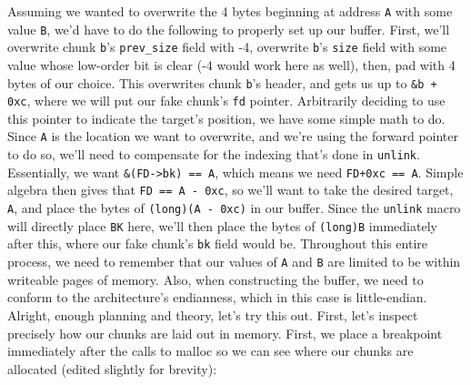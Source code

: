 Assuming we wanted to overwrite the 4 bytes beginning at address \texttt{A} with
some value \texttt{B}, we'd have to do the following to properly set up our
buffer. First, we'll overwrite chunk \texttt{b}'s \texttt{prev\_size} field with
-4, overwrite \texttt{b}'s \texttt{size} field with some value whose low-order bit
is clear (-4 would work here as well), then, pad with 4 bytes of our choice. This
overwrites chunk \texttt{b}'s header, and gets us up to \texttt{\&b + 0xc}, where
we will put our fake chunk's \texttt{fd} pointer. Arbitrarily deciding to use this pointer
to indicate the target's position, we have some simple math to do. Since \texttt{A}
is the location we want to overwrite, and we're using the forward pointer
to do so, we'll need to compensate for the indexing that's done in \texttt{unlink}.
Essentially, we want \texttt{\&(FD->bk) == A}, which means we need \texttt{FD+0xc == A}.
Simple algebra then gives that \texttt{FD == A - 0xc}, so we'll want to take the
desired target, \texttt{A}, and place the bytes of \texttt{(long)(A - 0xc)} in our
buffer. Since the \texttt{unlink} macro will directly place \texttt{BK} here,
we'll then place the bytes of \texttt{(long)B} immediately after this, where our fake
chunk's \texttt{bk} field would be. Throughout this entire process, we
need to remember that our values of \texttt{A} and \texttt{B} are limited to
be within writeable pages of memory. Also, when constructing the buffer, we need
to conform to the architecture's endianness, which in this case is little-endian.\\

Alright, enough planning and theory, let's try this out. First, let's inspect
precisely how our chunks are laid out in memory. First, we place a breakpoint 
immediately after the calls to malloc so we can see where our chunks are allocated
(edited slightly for brevity):

